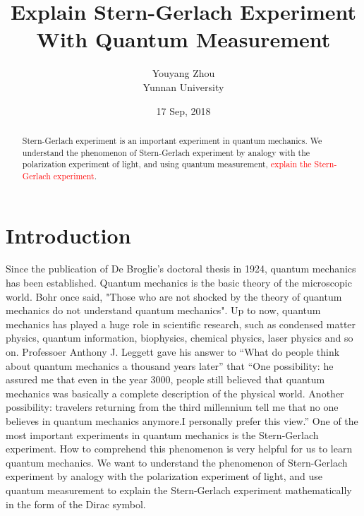 \documentclass[a4paper]{article}
\begin{document}
\title{Explain Stern-Gerlach Experiment With Quantum Measurement}
\author{Youyang Zhou\\Yunnan University}
\date{17 Sep, 2018}
\maketitle

\begin{abstract}
Stern-Gerlach experiment is an important experiment in quantum mechanics. We understand the phenomenon of Stern-Gerlach experiment by analogy with the polarization experiment of light, and using quantum measurement, 
\textcolor{red}{explain the Stern-Gerlach experiment}.  
\end{abstract}

\section{Introduction}
Since the publication of De Broglie's doctoral thesis in 1924, quantum mechanics has been established. Quantum mechanics is the basic theory of the microscopic world. Bohr once said, "Those who are not shocked by the theory of quantum mechanics do not understand quantum mechanics".
Up to now, quantum mechanics has played a huge role in scientific research, such as condensed matter physics, quantum information, biophysics, chemical physics, laser physics and so on. Professoer Anthony J. Leggett gave his answer to “What do people think about quantum mechanics a thousand years later” that “One possibility: he assured me that even in the year 3000, people still believed that quantum mechanics was basically a complete description of the physical world. Another possibility: travelers returning from the third millennium tell me that no one believes in quantum mechanics anymore.I personally prefer this view.”
One of the most important experiments in quantum mechanics is the Stern-Gerlach experiment. How to comprehend this phenomenon is very helpful for us to learn quantum mechanics.
We want to understand the phenomenon of Stern-Gerlach experiment by analogy with the polarization experiment of light, and use quantum measurement to explain the Stern-Gerlach experiment mathematically in the form of the Dirac symbol.
 
\end{document}
